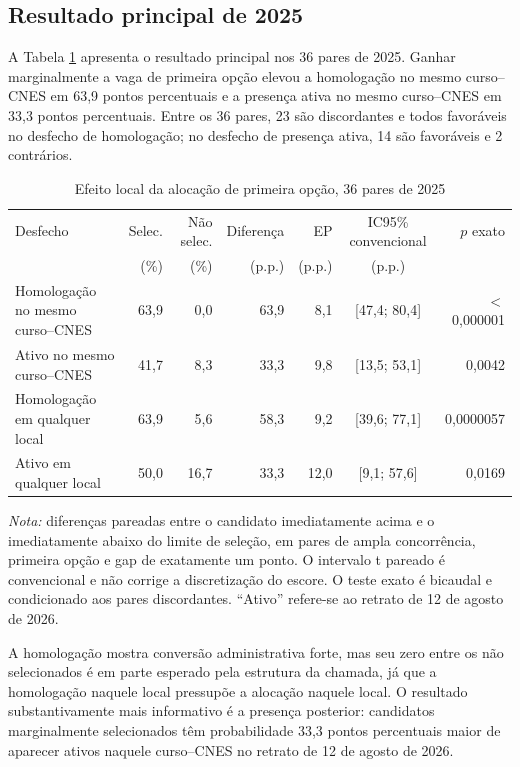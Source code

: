 \documentclass[11pt,a4paper]{article}
\begin{document}
\subsection{Resultado principal de 2025}

A Tabela \ref{tab:principal} apresenta o resultado principal nos 36 pares de
2025. Ganhar marginalmente a vaga de primeira opção elevou a homologação no
mesmo curso--CNES em 63,9 pontos percentuais e a presença ativa no mesmo
curso--CNES em 33,3 pontos percentuais. Entre os 36 pares, 23 são discordantes e
todos favoráveis no desfecho de homologação; no desfecho de presença ativa, 14
são favoráveis e 2 contrários.

\begin{table}[htbp]
\centering
\footnotesize
\setlength{\tabcolsep}{4pt}
\caption{Efeito local da alocação de primeira opção, 36 pares de 2025}
\label{tab:principal}
\begin{tabular}{lrrrrcr}
\toprule
Desfecho & Selec. & Não selec. & Diferença & EP & IC95\% convencional & $p$ exato \\
 & (\%) & (\%) & (p.p.) & (p.p.) & (p.p.) & \\
\midrule
Homologação no mesmo curso--CNES & 63,9 & 0,0 & 63,9 & 8,1 & [47,4; 80,4] & $<$0,000001 \\
Ativo no mesmo curso--CNES & 41,7 & 8,3 & 33,3 & 9,8 & [13,5; 53,1] & 0,0042 \\
Homologação em qualquer local & 63,9 & 5,6 & 58,3 & 9,2 & [39,6; 77,1] & 0,0000057 \\
Ativo em qualquer local & 50,0 & 16,7 & 33,3 & 12,0 & [9,1; 57,6] & 0,0169 \\
\bottomrule
\end{tabular}

\vspace{2pt}
\begin{minipage}{0.94\textwidth}
\footnotesize \textit{Nota:} diferenças pareadas entre o candidato imediatamente
acima e o imediatamente abaixo do limite de seleção, em pares de ampla
concorrência, primeira opção e gap de exatamente um ponto. O intervalo t pareado
é convencional e não corrige a discretização do escore. O teste exato é bicaudal
e condicionado aos pares discordantes. ``Ativo'' refere-se ao retrato de 12 de
agosto de 2026.
\end{minipage}
\end{table}

A homologação mostra conversão administrativa forte, mas seu zero entre os não
selecionados é em parte esperado pela estrutura da chamada, já que a homologação
naquele local pressupõe a alocação naquele local. O resultado substantivamente
mais informativo é a presença posterior: candidatos marginalmente selecionados
têm probabilidade 33,3 pontos percentuais maior de aparecer ativos naquele
curso--CNES no retrato de 12 de agosto de 2026.
\end{document}
